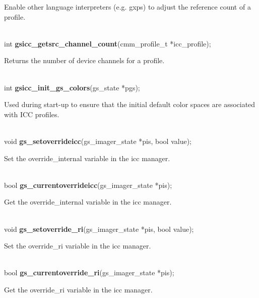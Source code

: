 \documentclass[12pt,notitlepage]{article}
\begin{document}
\begin{minipage}[h]{6.0in}
Enable other language interpreters (e.g. gxps) to adjust the reference count of a profile.
\end{minipage}\\

\noindent int {\bf gsicc\_getsrc\_channel\_count}(cmm\_profile\_t *icc\_profile);\\

\begin{minipage}[h]{6.0in}
Returns the number of device channels for a profile.
\end{minipage}\\

\noindent int {\bf gsicc\_init\_gs\_colors}(gs\_state *pgs);\\

\begin{minipage}[h]{6.0in}
Used during start-up to ensure that the initial default color spaces are associated with ICC profiles.
\end{minipage}\\

\noindent void {\bf gs\_setoverrideicc}(gs\_imager\_state *pis, bool value);\\

\begin{minipage}[h]{6.0in}
Set the override\_internal variable in the icc manager.
\end{minipage}\\

\noindent bool {\bf gs\_currentoverrideicc}(gs\_imager\_state *pis);\\

\begin{minipage}[h]{6.0in}
Get the override\_internal variable in the icc manager.
\end{minipage}\\

\noindent void {\bf gs\_setoverride\_ri}(gs\_imager\_state *pis, bool value);\\

\begin{minipage}[h]{6.0in}
Set the override\_ri variable in the icc manager.
\end{minipage}\\

\noindent bool {\bf gs\_currentoverride\_ri}(gs\_imager\_state *pis);\\

\begin{minipage}[h]{6.0in}
Get the override\_ri variable in the icc manager.
\end{minipage}\\
\end{document}
